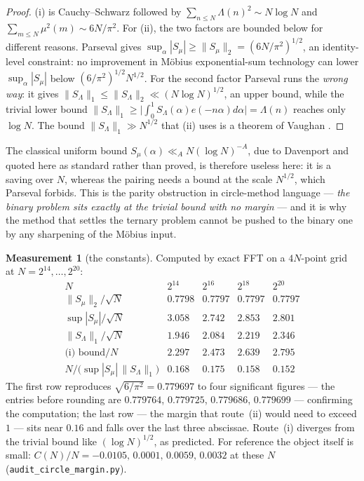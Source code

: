 \documentclass[11pt,a4paper]{article}
\theoremstyle{plain}
\theoremstyle{definition}
\newtheorem{measurement}[theorem]{Measurement}
\theoremstyle{remark}
\begin{document}
\begin{proof}
(i) is Cauchy--Schwarz followed by
$\sum_{n\le N}\Lambda(n)^2\sim N\log N$ and
$\sum_{m\le N}\mu^2(m)\sim6N/\pi^2$. For (ii), the two factors are
bounded below for different reasons. Parseval gives
$\sup_\alpha|S_\mu|\ge\|S_\mu\|_2=(6N/\pi^2)^{1/2}$, an
identity-level constraint: no improvement in M\"obius
exponential-sum technology can lower $\sup_\alpha|S_\mu|$ below
$(6/\pi^2)^{1/2}N^{1/2}$. For the second factor Parseval runs the
\emph{wrong way}: it gives $\|S_\Lambda\|_1\le\|S_\Lambda\|_2
\ll(N\log N)^{1/2}$, an upper bound, while the trivial lower bound
$\|S_\Lambda\|_1\ge\bigl|\int_0^1S_\Lambda(\alpha)e(-n\alpha)
d\alpha\bigr|=\Lambda(n)$ reaches only $\log N$. The bound
$\|S_\Lambda\|_1\gg N^{1/2}$ that (ii) uses is a theorem of Vaughan
\cite{Vau88}.
\end{proof}

The classical uniform bound $S_\mu(\alpha)\ll_AN(\log N)^{-A}$, due to
Davenport and quoted here as standard rather than proved, is
therefore useless here: it is a saving over $N$, whereas the pairing
needs a bound at the scale $N^{1/2}$, which Parseval forbids. This is
the parity obstruction in circle-method language --- \emph{the binary
problem sits exactly at the trivial bound with no margin} --- and it
is why the method that settles the ternary problem cannot be pushed to
the binary one by any sharpening of the M\"obius input.

\begin{measurement}[the constants]\label{meas:circle}
Computed by exact FFT on a $4N$-point grid at
$N=2^{14},\dots,2^{20}$:
\[
\begin{array}{r|cccc}
 N & 2^{14} & 2^{16} & 2^{18} & 2^{20}\\\hline
 \|S_\mu\|_2/\sqrt N & 0.7798 & 0.7797 & 0.7797 & 0.7797\\
 \sup|S_\mu|/\sqrt N & 3.058 & 2.742 & 2.853 & 2.801\\
 \|S_\Lambda\|_1/\sqrt N & 1.946 & 2.084 & 2.219 & 2.346\\
 \text{(i) bound}/N & 2.297 & 2.473 & 2.639 & 2.795\\
 N/\bigl(\sup|S_\mu|\,\|S_\Lambda\|_1\bigr) & 0.168 & 0.175 & 0.158
  & 0.152
\end{array}
\]
The first row reproduces $\sqrt{6/\pi^2}=0.779697$ to four significant
figures --- the entries before rounding are $0.779764$, $0.779725$,
$0.779686$, $0.779699$ --- confirming
the computation; the last row --- the margin that route~(ii) would
need to exceed $1$ --- sits near $0.16$ and falls over the last three
abscissae. Route~(i) diverges from the trivial bound like
$(\log N)^{1/2}$, as predicted. For reference the object itself is
small: $C(N)/N=-0.0105,\,0.0001,\,0.0059,\,0.0032$ at these $N$
(\texttt{audit\_circle\_margin.py}).
\end{measurement}
\end{document}
